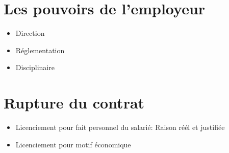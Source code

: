 \documentclass[12pt,a4paper,openany]{report}
\begin{document}
		\section{Les pouvoirs de l'employeur}
		\begin{itemize}
			\item Direction 
			\item Réglementation
			\item Disciplinaire 
		\end{itemize}
		\section{Rupture du contrat}
		\begin{itemize}
			\item Licenciement pour fait personnel du salarié: Raison réél et justifiée
			\item Licenciement pour motif économique
		\end{itemize}
\end{document}
